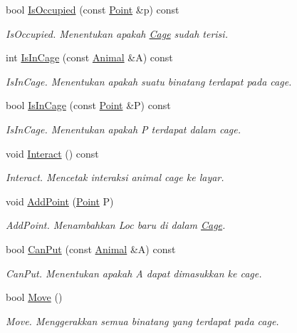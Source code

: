 \begin{DoxyCompactItemize}
bool \hyperlink{classCage_a176fc9feeb9855881e85c5d8551a6443}{Is\+Occupied} (const \hyperlink{classPoint}{Point} \&p) const 
\begin{DoxyCompactList}\small\item\em Is\+Occupied. Menentukan apakah \hyperlink{classCage}{Cage} sudah terisi. \end{DoxyCompactList}\item 
int \hyperlink{classCage_aaf098729df55f3cf45068d32fe6d5c4b}{Is\+In\+Cage} (const \hyperlink{classAnimal}{Animal} \&A) const 
\begin{DoxyCompactList}\small\item\em Is\+In\+Cage. Menentukan apakah suatu binatang terdapat pada cage. \end{DoxyCompactList}\item 
bool \hyperlink{classCage_a2ac9ea442655213ae3d52a6a7dc30fcf}{Is\+In\+Cage} (const \hyperlink{classPoint}{Point} \&P) const 
\begin{DoxyCompactList}\small\item\em Is\+In\+Cage. Menentukan apakah P terdapat dalam cage. \end{DoxyCompactList}\item 
void \hyperlink{classCage_a78f919dc2b8a3e89a7375c97643a2633}{Interact} () const 
\begin{DoxyCompactList}\small\item\em Interact. Mencetak interaksi animal cage ke layar. \end{DoxyCompactList}\item 
void \hyperlink{classCage_aed8ca487fb22db2ca755bc9d784342fc}{Add\+Point} (\hyperlink{classPoint}{Point} P)
\begin{DoxyCompactList}\small\item\em Add\+Point. Menambahkan Loc baru di dalam \hyperlink{classCage}{Cage}. \end{DoxyCompactList}\item 
bool \hyperlink{classCage_aece0c17d0299b55c596eb68175df71a8}{Can\+Put} (const \hyperlink{classAnimal}{Animal} \&A) const 
\begin{DoxyCompactList}\small\item\em Can\+Put. Menentukan apakah A dapat dimasukkan ke cage. \end{DoxyCompactList}\item 
bool \hyperlink{classCage_a973611397e576888027012237486cd25}{Move} ()
\begin{DoxyCompactList}\small\item\em Move. Menggerakkan semua binatang yang terdapat pada cage. \end{DoxyCompactList}\end{DoxyCompactItemize}
